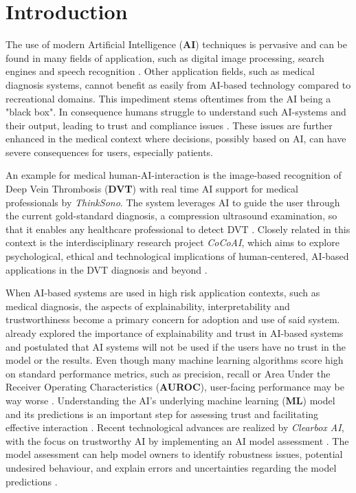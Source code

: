 \documentclass[11pt,a4paper,english]{scrreprt}
\begin{document}

\setlength{\parindent}{0em}
\setlength{\parskip}{1em}


\tableofcontents

\newpage
{}
\chapter{Introduction}\label{chapter:introduction}
The use of modern Artificial Intelligence (\textbf{AI}) techniques is pervasive and can be found in many fields of application, such as digital image processing, search engines and speech recognition \parencite{eu_com_ai}. Other application fields, such as medical diagnosis systems, cannot benefit as easily from AI-based technology compared to recreational domains. This impediment stems oftentimes from the AI being a "black box". In consequence humans struggle to understand such AI-systems and their output, leading to trust and compliance issues \parencite{adadi_blackbox_2018}. These issues are further enhanced in the medical context where decisions, possibly based on AI, can have severe consequences for users, especially patients.

An example for medical human-AI-interaction is the image-based recognition of Deep Vein Thrombosis (\textbf{DVT}) with real time AI support for medical professionals by \textit{Think\-Sono}. The system leverages AI to guide the user through the current gold-standard diagnosis, a compression ultrasound examination, so that it enables any healthcare professional to detect DVT \parencite{thinksono_website}. Closely related in this context is the interdisciplinary research project \textit{CoCoAI}, which aims to explore psychological, ethical and technological implications of human-centered, AI-based applications in the DVT diagnosis and beyond \parencite{cocoai_website}. 

When AI-based systems are used in high risk application contexts, such as medical diagnosis, the aspects of explainability, interpretability and trustworthiness become a primary concern for adoption and use of said system. \textcite{ribeiro_why_2016} already explored the importance of explainability and trust in AI-based systems and postulated that AI systems will not be used if the users have no trust in the model or the results. Even though many machine learning algorithms score high on standard performance metrics, such as precision, recall or Area Under the Receiver Operating Characteristics (\textbf{AUROC}), user-facing performance may be way worse \parencite{gordon_disagreement_2021}. Understanding the AI's underlying machine learning (\textbf{ML}) model and its predictions is an important step for assessing trust and facilitating effective interaction \parencite{ribeiro_why_2016}. Recent technological advances are realized by \textit{Clearbox AI}, with the focus on trustworthy AI by implementing an AI model assessment \parencite{clearbox_website, eu_trustworthy_ai}. The model assessment can help model owners to identify robustness issues, potential undesired behaviour, and explain errors and uncertainties regarding the model predictions \parencite{clearbox_wp}.
\end{document}
